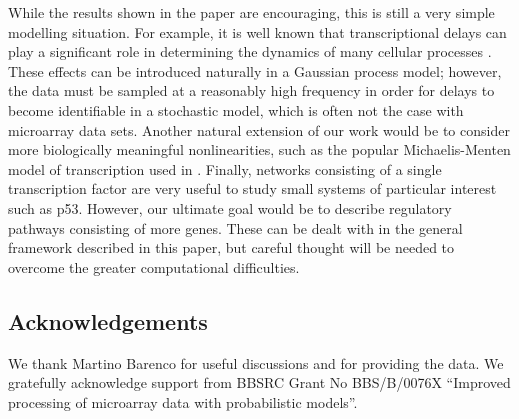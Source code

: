 \documentclass[english]{article}
\begin{document}
While the results shown in the paper are encouraging, this is still a very 
simple modelling situation. For example, it is well known that transcriptional 
delays can play a significant role in determining the dynamics of many
cellular processes \cite{Monk03}. These effects can be introduced naturally
in a Gaussian process model; however, the data must be sampled at a reasonably
high frequency in order for delays to become identifiable in a stochastic 
model, which is often not the case with microarray data sets. Another natural
extension of our work would be to consider more biologically meaningful
nonlinearities, such as the popular Michaelis-Menten model of transcription 
used in \cite{Rogers:model06}. Finally, networks consisting of a single
transcription factor are very useful
to study small systems of particular interest such as p53. However, our 
ultimate goal would be to describe regulatory pathways consisting of
more genes. These can be
dealt with in the general framework described in this paper, but 
careful thought
will be needed to overcome the greater computational difficulties.

\subsection*{Acknowledgements}

We thank Martino Barenco for useful discussions and for
providing the data. We gratefully acknowledge support from BBSRC Grant No BBS/B/0076X ``Improved processing of microarray data with probabilistic models''.
%
\small


\end{document}

